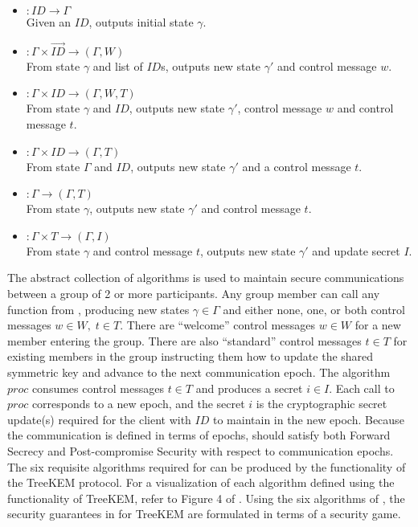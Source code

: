 \begin{itemize}
\item {}   \(: ID \to \Gamma\)\\
  Given an \(ID\), outputs initial state \(\gamma\).
\item {} \(: \Gamma \times \overrightarrow{ID} \to (\Gamma, W)\)\\
  From state \(\gamma\) and list of \(ID\)s, outputs new state \(\gamma'\) and control message \(w\).
\item {}    \(: \Gamma \times ID \to (\Gamma, W, T)\)\\
  From state \(\gamma\) and \(ID\), outputs new state \(\gamma'\), control message \(w\) and control message \(t\).
\item {}    \(: \Gamma \times ID \to (\Gamma, T)\)\\
  From state \(\Gamma\) and \(ID\), outputs new state \(\gamma'\) and a control message \(t\).
\item {}    \(: \Gamma \to (\Gamma, T)\)\\
  From state \(\gamma\), outputs new state \(\gamma'\) and control message \(t\).
\item {}   \(: \Gamma \times T \to (\Gamma, I)\)\\
  From state \(\gamma\) and control message \(t\), outputs new state \(\gamma'\) and update secret \(I\).
\end{itemize}

The abstract collection of algorithms \CGKAdef is used to maintain secure communications between a group of 2 or more participants.
Any group member can call any function from \CGKAdef, producing new states \(\gamma \in \Gamma\) and either none, one, or both control messages \(w \in W,\; t \in T\).
There are ``welcome'' control messages \(w \in W\) for a new member entering the group.
There are also ``standard'' control messages \(t \in T\) for existing members in the group instructing them how to update the shared symmetric key and advance to the next communication epoch.
The algorithm \(proc\) consumes control messages \(t \in T\) and produces a secret \(i \in I\).
Each call to \(proc\) corresponds to a new epoch, and the secret \(i\) is the cryptographic secret update(s) required for the client with \(ID\) to maintain  in the new epoch.
Because the communication is defined in terms of epochs,  should satisfy both Forward Secrecy and Post-compromise Security with respect to communication epochs.
The six requisite algorithms required for \CGKAdef can be produced by the functionality of the TreeKEM protocol.
For a visualization of each \CGKAdef algorithm defined using the functionality of TreeKEM, refer to Figure 4 of \autocite{alwen2020security}.
Using the six algorithms of \CGKAdef, the security guarantees in for TreeKEM are formulated in terms of a security game.

